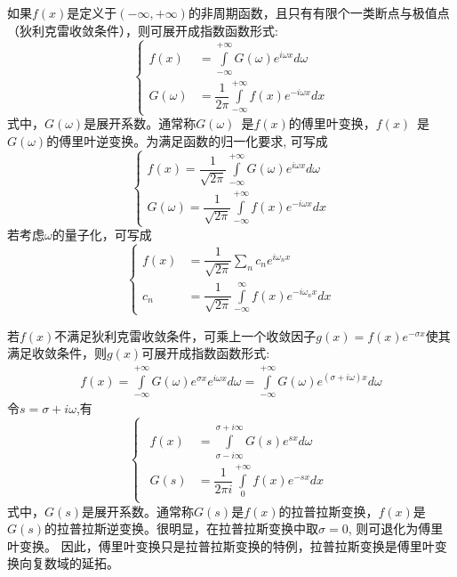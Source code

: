 如果$f(x)$是定义于$(-\infty,+\infty)$的非周期函数，且只有有限个一类断点与极值点（狄利克雷收敛条件），则可展开成指数函数形式: 
\begin{equation} \label{eq:fly2}
	\left\{ \begin{aligned}
		f(x) &=\int\limits_{-\infty}^{+\infty}  G(\omega) e^{i\omega x} d\omega\\
		G(\omega) &= \dfrac{1}{2\pi} \int\limits_{-\infty}^{+\infty}  f(x) e^{-i\omega x} dx 
	\end{aligned} \right.
\end{equation}
式中，$G(\omega)$是展开系数。通常称$G(\omega)$ 是$f(x)$的傅里叶变换，$f(x)$ 是$G(\omega)$的傅里叶逆变换。为满足函数的归一化要求, 可写成
\begin{equation} \label{eq:fly3}
	\left\{ \begin{aligned}
	f(x) = \dfrac{1}{\sqrt{2\pi} }\int\limits_{-\infty}^{+\infty}  G(\omega) e^{i\omega x} d\omega\\
	G(\omega) = \dfrac{1}{\sqrt{2\pi} } \int\limits_{-\infty}^{+\infty}  f(x) e^{-i\omega x} dx 
\end{aligned} \right. 
\end{equation}
若考虑$\omega$的量子化，可写成 
\begin{equation} \label{eq:fly4}
	\left\{ \begin{aligned}
	f(x)& = \dfrac{1}{\sqrt{2\pi} }\sum_n c_n e^{i\omega_n x} \\
	c_n &=\dfrac{1}{\sqrt{2\pi} }  \int\limits_{-\infty}^{\infty}  f(x)  e^{-i\omega_n x}  d x 
\end{aligned} \right. 
\end{equation}

若$f(x)$不满足狄利克雷收敛条件，可乘上一个收敛因子$g(x) = f(x) e^{-\sigma x}$使其满足收敛条件，则$g(x)$可展开成指数函数形式:
$$
\begin{aligned}
	f(x) =\int\limits_{-\infty}^{+\infty}  G(\omega) e^{\sigma x} e^{i\omega x} d\omega
	=\int\limits_{-\infty}^{+\infty}  G(\omega) e^{(\sigma +i\omega) x} d\omega 
\end{aligned}$$
令$s = \sigma +i\omega$,有
$$ \begin{cases}
\begin{aligned}
	f(x)&=\int\limits_{\sigma-i\infty}^{\sigma+i\infty}  G(s) e^{s x} d\omega\\
	G(s) &= \dfrac{1}{2\pi i} \int\limits_{0}^{+\infty}  f(x) e^{- s x} dx 
\end{aligned}
\end{cases}  $$
式中，$G(s)$是展开系数。通常称$G(s)$是$f(x)$的拉普拉斯变换，$f(x)$是$G(s)$的拉普拉斯逆变换。很明显，在拉普拉斯变换中取$\sigma =0$, 则可退化为傅里叶变换。 因此，傅里叶变换只是拉普拉斯变换的特例，拉普拉斯变换是傅里叶变换向复数域的延拓。

